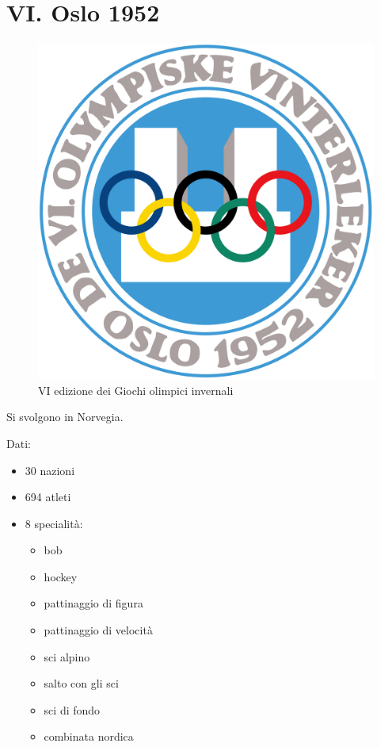 \documentclass[
]{book}
\providecommand{\tightlist}{%
  \setlength{\itemsep}{0pt}\setlength{\parskip}{0pt}}
\begin{document}
\chapter*{VI. Oslo 1952}\label{vi.-oslo-1952}

\begin{figure}
\includegraphics[width=0.4\linewidth]{images/loghi/1952} \caption{VI edizione dei Giochi olimpici invernali}\label{fig:unnamed-chunk-15}
\end{figure}

Si svolgono in Norvegia.

Dati:

\begin{itemize}
\tightlist
\item
  30 nazioni
\item
  694 atleti
\item
  8 specialità:

  \begin{itemize}
  \tightlist
  \item
    bob
  \item
    hockey
  \item
    pattinaggio di figura
  \item
    pattinaggio di velocità
  \item
    sci alpino
  \item
    salto con gli sci
  \item
    sci di fondo
  \item
    combinata nordica
  \end{itemize}
\end{itemize}
\end{document}
